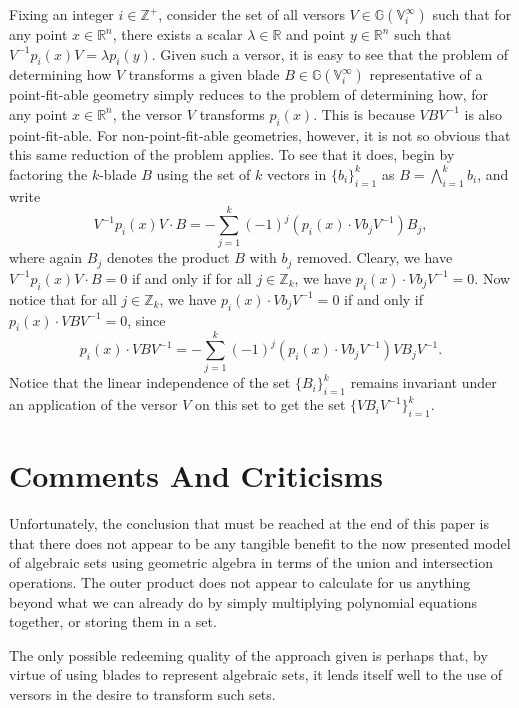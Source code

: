 \documentclass{birkjour}
\theoremstyle{definition}
\theoremstyle{remark}
\numberwithin{equation}{section}
\newcommand{\G}{\mathbb{G}}
\newcommand{\V}{\mathbb{V}}
\newcommand{\R}{\mathbb{R}}
\newcommand{\Z}{\mathbb{Z}}
\begin{document}
Fixing an integer $i\in\Z^+$, consider the set of all versors
$V\in\G(\V_i^\infty)$ such that for any point $x\in\R^n$,
there exists a scalar $\lambda\in\R$ and point $y\in\R^n$ such that $V^{-1}p_i(x)V=\lambda p_i(y)$.
Given such a versor, it is easy to see that the
problem of determining how $V$
transforms a given blade $B\in\G(\V_i^\infty)$ representative
of a point-fit-able geometry simply reduces
to the problem of determining how, for any point $x\in\R^n$,
the versor $V$ transforms $p_i(x)$.  This is because $VBV^{-1}$
is also point-fit-able.  For non-point-fit-able
geometries, however, it is not so obvious that this
same reduction of the problem applies.
To see that it does, begin by
factoring the $k$-blade $B$ using the set of $k$ vectors in $\{b_i\}_{i=1}^k$
as $B=\bigwedge_{i=1}^k b_i$, and write
\begin{equation}
V^{-1}p_i(x)V\cdot B=-\sum_{j=1}^k(-1)^j(p_i(x)\cdot Vb_jV^{-1})B_j,
\end{equation}
where again $B_j$ denotes the product $B$ with $b_j$ removed.
Cleary, we have $V^{-1}p_i(x)V\cdot B=0$ if and only if for all $j\in\Z_k$,
we have $p_i(x)\cdot Vb_jV^{-1}=0$.  Now notice that for all $j\in\Z_k$,
we have $p_i(x)\cdot Vb_jV^{-1}=0$ if and only if $p_i(x)\cdot VBV^{-1}=0$,
since
\begin{equation}
p_i(x)\cdot VBV^{-1} = -\sum_{j=1}^k(-1)^j(p_i(x)\cdot Vb_jV^{-1})VB_jV^{-1}.
\end{equation}
Notice that the linear independence of the set $\{B_i\}_{i=1}^k$ remains invariant
under an application of the versor $V$ on this set to get the set $\{VB_iV^{-1}\}_{i=1}^k$.



\section{Comments And Criticisms}

Unfortunately, the conclusion that must be reached at the end of this paper is
that there does not appear to be any tangible benefit to the now
presented model of algebraic sets using geometric algebra in terms
of the union and intersection operations.  The outer product does not
appear to calculate for us anything beyond what we can already
do by simply multiplying polynomial equations together, or storing
them in a set.

The only possible redeeming quality of the approach given is perhaps
that, by virtue of using blades to represent algebraic sets, it lends
itself well to the use of versors in the desire to transform such sets.
\end{document}
